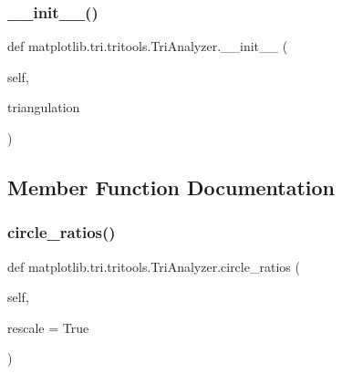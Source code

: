 \subsubsection{\texorpdfstring{\+\_\+\+\_\+init\+\_\+\+\_\+()}{\_\_init\_\_()}}
{\footnotesize\ttfamily def matplotlib.\+tri.\+tritools.\+Tri\+Analyzer.\+\_\+\+\_\+init\+\_\+\+\_\+ (\begin{DoxyParamCaption}\item[{}]{self,  }\item[{}]{triangulation }\end{DoxyParamCaption})}



\subsection{Member Function Documentation}
\mbox{\label{classmatplotlib_1_1tri_1_1tritools_1_1TriAnalyzer_a8e10c628fc8056d83ce6f90a1e15c072}} 
\subsubsection{\texorpdfstring{circle\+\_\+ratios()}{circle\_ratios()}}
{\footnotesize\ttfamily def matplotlib.\+tri.\+tritools.\+Tri\+Analyzer.\+circle\+\_\+ratios (\begin{DoxyParamCaption}\item[{}]{self,  }\item[{}]{rescale = {\ttfamily True} }\end{DoxyParamCaption})}

